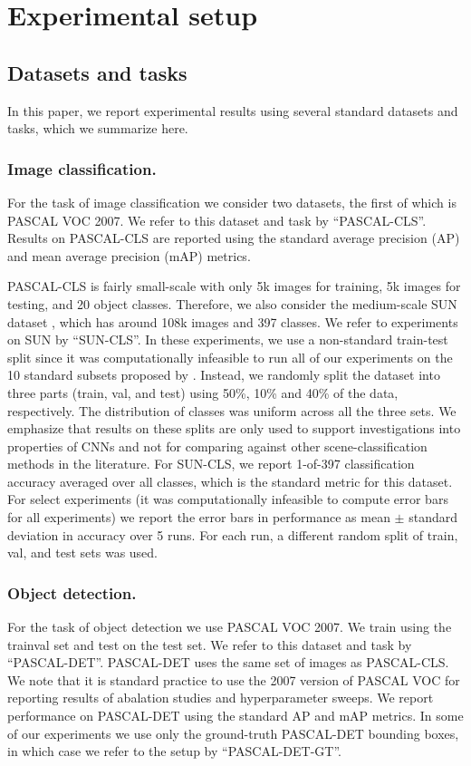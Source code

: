 \section{Experimental setup}
\label{sec:train}

\subsection{Datasets and tasks}
In this paper, we report experimental results using several standard datasets and tasks, which we summarize here.

\subsubsection{Image classification.} For the task of image classification we consider two datasets, the first of which is PASCAL VOC 2007.
We refer to this dataset and task by ``PASCAL-CLS''.
Results on PASCAL-CLS are reported using the standard average precision (AP) and mean average precision (mAP) metrics.

PASCAL-CLS is fairly small-scale with only 5k images for training, 5k images for testing, and 20 object classes.
Therefore, we also consider the medium-scale SUN dataset \cite{sun}, which has around 108k images and 397 classes.
We refer to experiments on SUN by ``SUN-CLS''.
In these experiments, we use a non-standard train-test split since it was computationally infeasible to run all of our experiments on the 10 standard subsets proposed by \cite{sun}. 
Instead, we randomly split the dataset into three parts (train, val, and test) using 50\%, 10\% and 40\% of the data, respectively. 
The distribution of classes was uniform across all the three sets.
We emphasize that results on these splits are only used to support investigations into properties of CNNs and not for comparing against other scene-classification methods in the literature.
For SUN-CLS, we report 1-of-397 classification accuracy averaged over all classes, which is the standard metric for this dataset.
For select experiments (it was computationally infeasible to compute error bars for all experiments) we report the error bars in performance as mean $\pm$ standard deviation in accuracy over 5 runs. For each run, a different random split of train, val, and test sets was used.  

\subsubsection{Object detection.} For the task of object detection we use PASCAL VOC 2007.
We train using the trainval set and test on the test set.
We refer to this dataset and task by ``PASCAL-DET''.
PASCAL-DET uses the same set of images as PASCAL-CLS.
We note that it is standard practice to use the 2007 version of PASCAL VOC for reporting results of abalation studies and hyperparameter sweeps.
We report performance on PASCAL-DET using the standard AP and mAP metrics.
In some of our experiments we use only the ground-truth PASCAL-DET bounding boxes, in which case we refer to the setup by ``PASCAL-DET-GT''.


